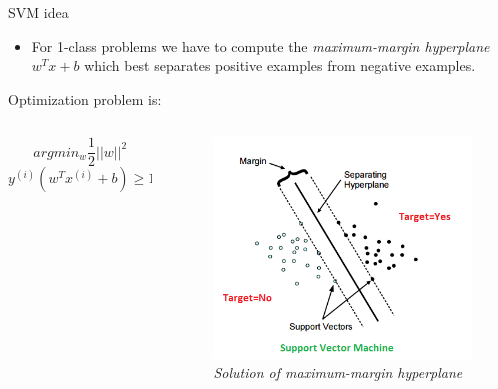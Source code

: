 \begin{frame}{SVM idea}
	\begin{itemize}\setlength\itemsep{1em}
		\item For 1-class problems we have to compute the \textit{maximum-margin hyperplane} $w^Tx + b$ which best separates positive examples from negative examples.
	\end{itemize}
	Optimization problem is:
	\begin{columns}
		\begin{column}{0.5\textwidth}\centering
			$$arg min_w \frac{1}{2} ||w||^2$$
			$$y^{(i)} (w^T x^{(i)} + b) \geq 1 \ \forall i \in [1, n]$$
		\end{column}
		\begin{column}{0.5\textwidth}\centering
			\begin{figure}[htbp]
				\centering
				\includegraphics[scale = 0.40]{./images/optimal-hyperplane2.png}
				\caption{\textit{Solution of maximum-margin hyperplane}}
			\end{figure}
		\end{column}
	\end{columns}
	
	
	
\end{frame}

